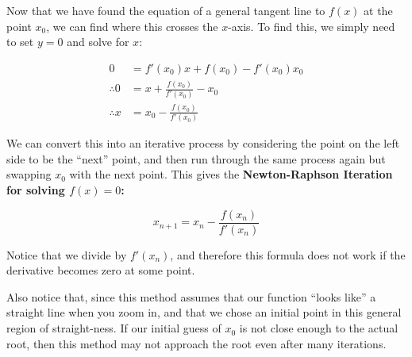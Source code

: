 Now that we have found the equation of a general tangent line to $f(x)$ at the point $x_0$, we can find where this crosses the $x$-axis.
To find this, we simply need to set $y=0$ and solve for $x$:

\begin{align*}
    0 &= f'(x_0)x + f(x_0) - f'(x_0)x_0 \tag{setting $y=0$}\\
    \therefore 0 &= x + \frac{f(x_0)}{f'(x_0)} - x_0 \tag{dividing by $f'(x_0)$}\\
    \therefore x &= x_0 - \frac{f(x_0)}{f'(x_0)} 
\end{align*}

We can convert this into an iterative process by considering the point on the left side to be the ``next'' point, and then run through the same process again but swapping $x_0$ with the next point. This gives the 
\textbf{Newton-Raphson Iteration for solving $f(x)=0$:}

\[ x_{n+1} = x_n - \frac{f(x_n)}{f'(x_n)}\]

Notice that we divide by $f'(x_n)$, and therefore this formula does not work if the derivative becomes zero at some point.

Also notice that, since this method assumes that our function ``looks like'' a straight line when you zoom in, and that we chose an initial point in this general region of straight-ness. If our initial guess of $x_0$ is not close enough to the actual root, then this method may not approach the root even after many iterations.


